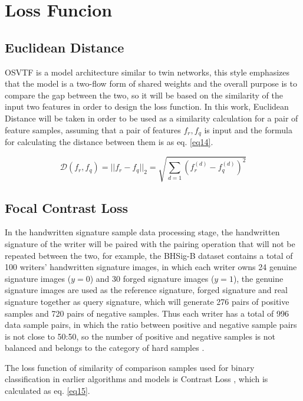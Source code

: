 \section{Loss Funcion}

\subsection{Euclidean Distance}

OSVTF is a model architecture similar to twin networks, this style emphasizes that the model is a two-flow form of shared weights and the overall purpose is to compare the gap between the two, so it will be based on the similarity of the input two features in order to design the loss function. In this work, Euclidean Distance \cite{5} will be taken in order to be used as a similarity calculation for a pair of feature samples, assuming that a pair of features $f_r,f_q$ is input and the formula for calculating the distance between them is as eq. \ref{eq14}.

\begin{equation}
\label{eq14}
  \mathcal{D}(f_r, f_q) = ||f_r - f_q||_2=\sqrt{\sum_{d=1}(f^{(d)}_r - f^{(d)}_q)^2}
\end{equation}

\subsection{Focal Contrast Loss}

In the handwritten signature sample data processing stage, the handwritten signature of the writer will be paired with the pairing operation that will not be repeated between the two, for example, the BHSig-B \cite{3} dataset contains a total of 100 writers' handwritten signature images, in which each writer owns 24 genuine signature images ($y=0$) and 30 forged signature images ($y=1$), the genuine signature images are used as the reference signature, forged signature and real signature together as query signature, which will generate 276 pairs of positive samples and 720 pairs of negative samples. Thus each writer has a total of 996 data sample pairs, in which the ratio between positive and negative sample pairs is not close to 50:50, so the number of positive and negative samples is not balanced and belongs to the category of hard samples \cite{33}. 

The loss function of similarity of comparison samples used for binary classification in earlier algorithms and models is Contrast Loss \cite{10}, which is calculated as eq. \ref{eq15}.

